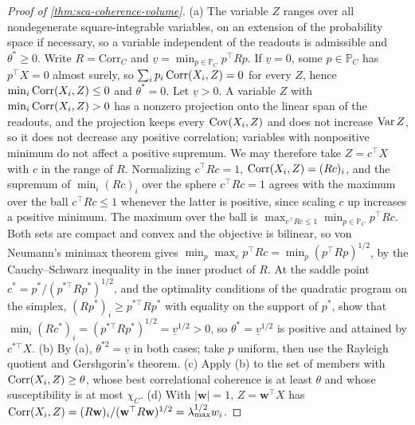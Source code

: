\begin{proof}[Proof of \cref{thm:sca-coherence-volume}]
(a) The variable $Z$ ranges over all nondegenerate square-integrable variables, on an extension of the probability space if necessary, so a variable independent of the readouts is admissible and $\theta^\ast\ge0$. Write $R=\mathrm{Corr}_C$ and $\underline v=\min_{p\in\mathbb P_C}p^\top Rp$. If $\underline v=0$, some $p\in\mathbb P_C$ has $p^\top X=0$ almost surely, so $\sum_ip_i\operatorname{Corr}(X_i,Z)=0$ for every $Z$, hence $\min_i\operatorname{Corr}(X_i,Z)\le0$ and $\theta^\ast=0$. Let $\underline v>0$. A variable $Z$ with $\min_i\operatorname{Corr}(X_i,Z)>0$ has a nonzero projection onto the linear span of the readouts, and the projection keeps every $\operatorname{Cov}(X_i,Z)$ and does not increase $\operatorname{Var} Z$, so it does not decrease any positive correlation; variables with nonpositive minimum do not affect a positive supremum. We may therefore take $Z=c^\top X$ with $c$ in the range of $R$. Normalizing $c^\top Rc=1$, $\operatorname{Corr}(X_i,Z)=(Rc)_i$, and the supremum of $\min_i(Rc)_i$ over the sphere $c^\top Rc=1$ agrees with the maximum over the ball $c^\top Rc\le1$ whenever the latter is positive, since scaling $c$ up increases a positive minimum. The maximum over the ball is $\max_{c^\top Rc\le1}\min_{p\in\mathbb P_C}p^\top Rc$. Both sets are compact and convex and the objective is bilinear, so von Neumann's minimax theorem gives $\min_p\max_cp^\top Rc=\min_p(p^\top Rp)^{1/2}$, by the Cauchy--Schwarz inequality in the inner product of $R$. At the saddle point $c^\ast=p^\ast/(p^{\ast\top}Rp^\ast)^{1/2}$, and the optimality conditions of the quadratic program on the simplex, $(Rp^\ast)_i\ge p^{\ast\top}Rp^\ast$ with equality on the support of $p^\ast$, show that $\min_i(Rc^\ast)_i=(p^{\ast\top}Rp^\ast)^{1/2}=\underline v^{1/2}>0$, so $\theta^\ast=\underline v^{1/2}$ is positive and attained by $c^{\ast\top}X$. (b) By (a), $\theta^{\ast2}=\underline v$ in both cases; take $p$ uniform, then use the Rayleigh quotient and Gershgorin's theorem. (c) Apply (b) to the set of members with $\operatorname{Corr}(X_i,Z)\ge\theta$, whose best correlational coherence is at least $\theta$ and whose susceptibility is at most $\chi_C$. (d) With $|\mathbf w|=1$, $Z=\mathbf w^\top X$ has $\operatorname{Corr}(X_i,Z)=(R\mathbf w)_i/(\mathbf w^\top R\mathbf w)^{1/2}=\lambda_{\max}^{1/2}w_i$.
\end{proof}


